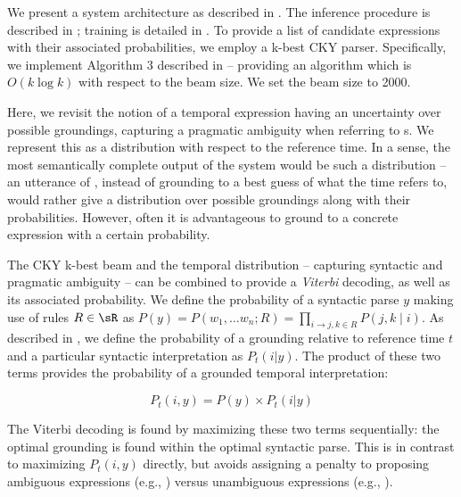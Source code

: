 We present a system architecture as described in .
The inference procedure is described in ;
	training is detailed in .
To provide a list of
	candidate expressions with their associated probabilities, we
	employ a k-best CKY parser.
Specifically, we implement Algorithm 3 described in 
	 -- providing an algorithm which is
	$O(k\log k)$ with respect to the beam size.
We set the beam size to 2000.

Here, we revisit the notion of a temporal expression having an uncertainty
	over possible groundings, capturing a pragmatic ambiguity when
	referring to s.
We represent this as a distribution with respect to the reference time.
In a sense, the most semantically complete output of the system would be
	such a distribution -- 
	an utterance of , instead of grounding to a 
	best guess of what the time refers to, would rather give a 
	distribution over possible groundings along with their probabilities.
However, often it is advantageous to ground to a concrete expression with a
	certain probability.

The CKY k-best beam and the temporal distribution 
	-- capturing syntactic and pragmatic ambiguity --
	can be combined to provide a \textit{Viterbi} decoding, as well as
	its associated probability.
We define the probability of a syntactic parse $y$ making use of rules 
	$R \in \sR$ as
	$P(y) = P(w_1,\dots w_n; R) = \prod_{i \rightarrow j,k \in R}P(j,k \mid i)$.
	As described in , we define the probability of a 
	grounding relative to reference time $t$ and a particular
	syntactic interpretation as $P_t(i | y)$.
The product of these two terms provides the probability of a grounded temporal
	interpretation:

\begin{equation}
	P_t(i, y) = 
		P( y ) \times P_t(i | y)
\label{eqn:prob}
\end{equation}

The Viterbi decoding is found by maximizing these two terms sequentially:
	the optimal grounding is found within the optimal syntactic parse.
This is in contrast to maximizing $P_t(i,y)$ directly, but avoids
	assigning a penalty to proposing ambiguous expressions (e.g., )
	versus unambiguous expressions (e.g., ).

